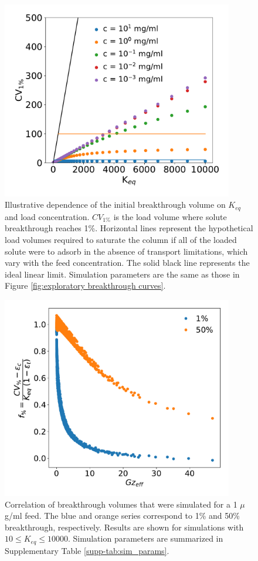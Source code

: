 \documentclass[11pt,a4paper]{article}
\begin{document}
\begin{figure}[bp]
    \centering
    \includegraphics[width=0.9\textwidth]{figure_2}
    \caption{Illustrative dependence of the initial breakthrough volume on $K_{eq}$ and load concentration. $CV_{1\%}$ is the load volume where solute breakthrough reaches 1\%. Horizontal lines represent the hypothetical load volumes required to saturate the column if all of the loaded solute were to adsorb in the absence of transport limitations, which vary with the feed concentration. The solid black line represents the ideal linear limit. Simulation parameters are the same as those in Figure \ref{fig:exploratory breakthrough curves}.}
    \label{fig:initial breakthrough volumes vs Keq}
\end{figure}


\begin{figure}[bp]
    \centering
    \includegraphics[width=0.9\textwidth]{figure_3}
    \caption{Correlation of breakthrough volumes that were simulated for a 1 $\mu$g/ml feed. The blue and orange series correspond to 1\% and 50\% breakthrough, respectively. Results are shown for simulations with $10 \leq K_{eq} \leq 10000$. Simulation parameters are summarized in Supplementary Table \protect\ref{supp-tab:sim_params}.}
    \label{fig:correlation of breakthrough volumes}
\end{figure}
\end{document}
